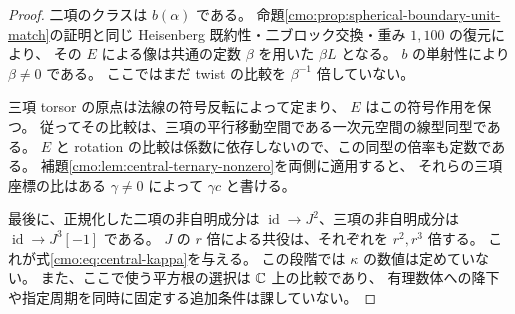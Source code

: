 \begin{proof}
二項のクラスは $b(\alpha)$ である。
命題\ref{cmo:prop:spherical-boundary-unit-match}の証明と同じ
Heisenberg 既約性・二ブロック交換・重み $1,100$ の復元により、
その $E$ による像は共通の定数 $\beta$ を用いた $\beta L$ となる。
$b$ の単射性により $\beta\ne0$ である。
ここではまだ twist の比較を $\beta^{-1}$ 倍していない。

三項 torsor の原点は法線の符号反転によって定まり、
$E$ はこの符号作用を保つ。
従ってその比較は、三項の平行移動空間である一次元空間の線型同型である。
$E$ と rotation の比較は係数に依存しないので、この同型の倍率も定数である。
補題\ref{cmo:lem:central-ternary-nonzero}を両側に適用すると、
それらの三項座標の比はある $\gamma\ne0$ によって $\gamma c$ と書ける。

最後に、正規化した二項の非自明成分は
$\operatorname{id}\to J^2$、三項の非自明成分は
$\operatorname{id}\to J^3[-1]$ である。
$J$ の $r$ 倍による共役は、それぞれを $r^2,r^3$ 倍する。
これが式\eqref{cmo:eq:central-kappa}を与える。
この段階では $\kappa$ の数値は定めていない。
また、ここで使う平方根の選択は $\mathbb C$ 上の比較であり、
有理数体への降下や指定周期を同時に固定する追加条件は課していない。
\end{proof}
